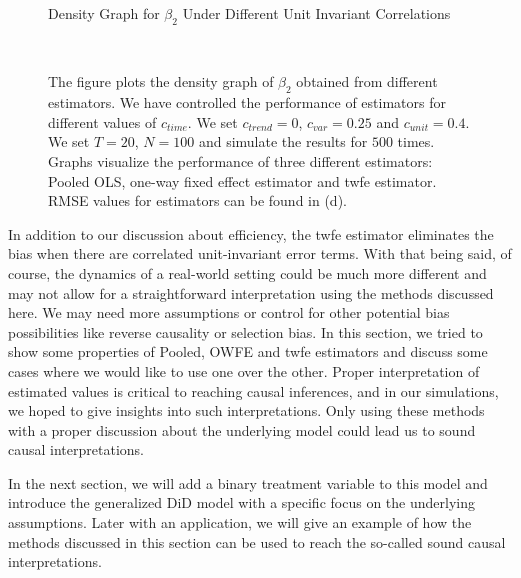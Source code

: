 \documentclass[12pt, a4paper]{article}
\begin{document}
\begin{figure}[t]
    \caption{Density Graph for $ \beta_2 $ Under Different Unit Invariant Correlations}
     \\
    \caption*{\scriptsize{The figure plots the density graph of $\beta_2$
    obtained from different estimators. We have controlled the performance of
    estimators for different values of $c_{time}$. We set $c_{trend} = 0$, $c_{var} = 0.25$
    and $c_{unit} = 0.4$. We set $T = 20$, $N = 100$ and simulate the results
    for $500$ times. Graphs visualize the performance
    of three different estimators: Pooled OLS, one-way fixed effect estimator and
    \ac{twfe} estimator. RMSE values for estimators can be found in  (d).
    \label{fig:c4}}}
\end{figure}

In addition to our discussion about efficiency, the  \ac{twfe} estimator eliminates the bias when there are correlated unit-invariant error terms.
With that being said, of course, the dynamics of a real-world setting could be much more different and may not allow for a straightforward interpretation using the methods discussed here.
We may need more assumptions or control for other potential bias possibilities like reverse causality or selection bias. In this section, we tried to show some properties of Pooled, \ac{OWFE} and
\ac{twfe} estimators and discuss some cases where we would like to use one over the other. Proper interpretation of estimated values is critical to reaching causal inferences, and in our simulations, we hoped to give insights into such interpretations. Only using these methods with a proper discussion about the underlying model could lead us to sound causal interpretations.

In the next section, we will add a binary treatment variable to this model and introduce the generalized DiD model with a  specific focus on the underlying assumptions. Later with an application, we will give an example of how the methods discussed in this section can be used to reach the so-called sound causal interpretations.
\end{document}
